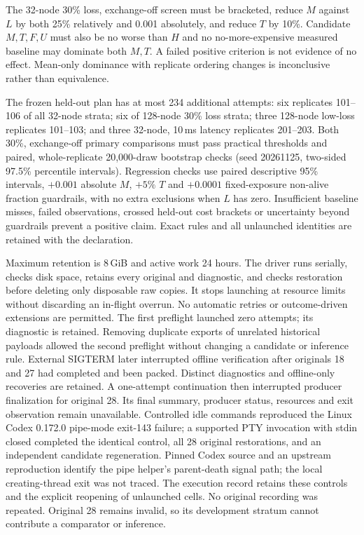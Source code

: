 \documentclass[10pt]{article}
\begin{document}
The 32-node 30\% loss, exchange-off screen must be bracketed, reduce $M$
against $L$ by both 25\% relatively and 0.001 absolutely, and reduce $T$
by 10\%. Candidate $M,T,F,U$ must also be no worse than $H$ and no
no-more-expensive measured baseline may dominate both $M,T$. A failed
positive criterion is not evidence of no effect. Mean-only dominance with
replicate ordering changes is inconclusive rather than equivalence.

The frozen held-out plan has at most 234 additional attempts: six
replicates 101--106 of all 32-node strata; six of 128-node 30\% loss
strata; three 128-node low-loss replicates 101--103; and three 32-node,
10\,ms latency replicates 201--203. Both 30\%, exchange-off primary
comparisons must pass practical thresholds and paired, whole-replicate
20,000-draw bootstrap checks (seed 20261125, two-sided 97.5\% percentile
intervals). Regression checks use paired descriptive 95\% intervals,
$+0.001$ absolute $M$, $+5\%$ $T$ and $+0.0001$ fixed-exposure non-alive
fraction guardrails, with no extra exclusions when $L$ has zero. Insufficient
baseline misses, failed observations, crossed held-out cost brackets or
uncertainty beyond guardrails prevent a positive claim. Exact rules and
all unlaunched identities are retained with the declaration.

Maximum retention is 8\,GiB and active work 24 hours. The driver runs
serially, checks disk space, retains every original and diagnostic, and
checks restoration before deleting only disposable raw copies. It stops
launching at resource limits without discarding an in-flight overrun.
No automatic retries or outcome-driven extensions are permitted. The
first preflight launched zero attempts; its diagnostic is retained.
Removing duplicate exports of unrelated historical payloads allowed the
second preflight without changing a candidate or inference rule. External SIGTERM later interrupted offline verification after originals
18 and 27 had completed and been packed. Distinct diagnostics and offline-only
recoveries are retained. A one-attempt continuation then interrupted producer
finalization for original 28. Its final summary, producer status, resources and
exit observation remain unavailable. Controlled idle commands reproduced the
Linux Codex 0.172.0 pipe-mode exit-143 failure; a supported PTY invocation
with stdin closed completed the identical control, all 28 original
restorations, and an independent candidate regeneration. Pinned Codex
source and an upstream reproduction identify the pipe helper's parent-death
signal path; the local creating-thread exit was not traced. The execution
record retains these controls and the explicit reopening of unlaunched
cells. No original recording was repeated. Original 28 remains invalid,
so its development stratum cannot contribute a comparator or inference.
\end{document}
